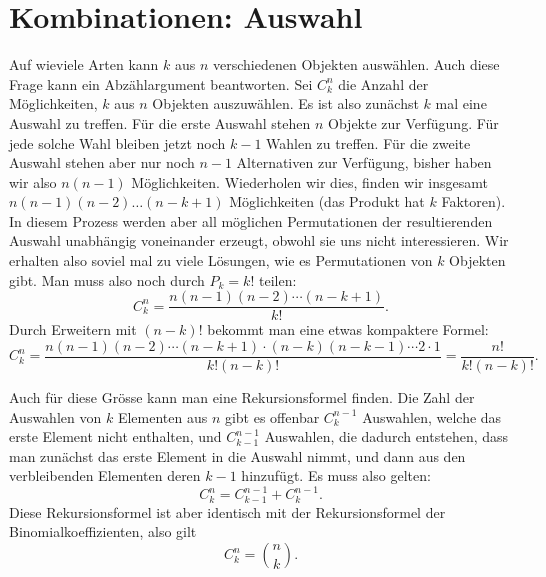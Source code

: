 \section{Kombinationen: Auswahl}
Auf wieviele Arten kann $k$ aus $n$ verschiedenen Objekten
auswählen.
Auch diese Frage kann ein Abzählargument
beantworten.
Sei $C^n_k$ die Anzahl der Möglichkeiten,
$k$ aus $n$ Objekten auszuwählen.
Es ist also zunächst
$k$ mal eine Auswahl zu treffen.
Für die erste Auswahl stehen $n$ Objekte zur Verfügung.
Für jede solche Wahl bleiben jetzt noch $k-1$ Wahlen zu treffen.
Für die zweite
Auswahl stehen aber nur noch $n-1$ Alternativen zur Verfügung,
bisher haben wir also $n(n-1)$ Möglichkeiten.
Wiederholen wir
dies, finden wir insgesamt $n(n-1)(n-2)\dots(n-k+1)$ Möglichkeiten
(das Produkt hat $k$ Faktoren).
In diesem Prozess werden
aber all möglichen Permutationen der resultierenden Auswahl
unabhängig voneinander erzeugt, obwohl sie uns nicht
interessieren.
Wir erhalten also soviel mal zu viele Lösungen, wie
es Permutationen von $k$ Objekten gibt.
Man muss also noch durch
$P_k=k!$ teilen:
\[
C^n_k=\frac{n(n-1)(n-2)\dotsm(n-k+1)}{k!}.
\]
Durch Erweitern mit $(n-k)!$ bekommt man eine etwas
kompaktere Formel:
\[
C^n_k
=
\frac{n(n-1)(n-2)\dotsm(n-k+1)\cdot(n-k)(n-k-1)\dotsm2\cdot 1}{k!(n-k)!}
=
\frac{n!}{k!(n-k)!}.
\]

Auch für diese Grösse kann man eine Rekursionsformel finden.
Die Zahl der Auswahlen von $k$ Elementen aus $n$ gibt es
offenbar $C^{n-1}_{k}$ Auswahlen, welche das erste Element nicht
enthalten, und $C^{n-1}_{k-1}$ Auswahlen, die dadurch entstehen,
dass man zunächst das erste Element in die Auswahl nimmt, und dann
aus den verbleibenden Elementen deren $k-1$ hinzufügt.
Es muss also
gelten:
\[
C^n_k=C^{n-1}_{k-1}+C^{n-1}_{k}.
\]
Diese Rekursionsformel ist aber identisch mit der Rekursionsformel
der Binomialkoeffizienten, also gilt
\[
C^n_k=\binom{n}{k}.
\]

